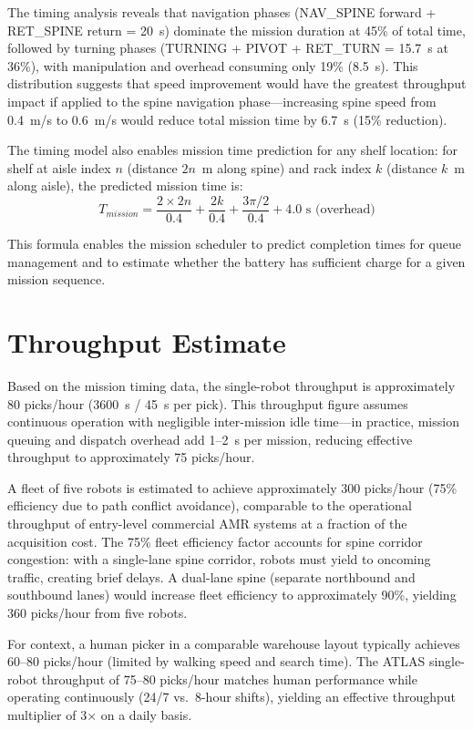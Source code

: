 \documentclass[12pt,a4paper,oneside]{report}
\begin{document}
The timing analysis reveals that navigation phases (NAV\_SPINE forward + RET\_SPINE return = 20~s) dominate the mission duration at 45\% of total time, followed by turning phases (TURNING + PIVOT + RET\_TURN = 15.7~s at 36\%), with manipulation and overhead consuming only 19\% (8.5~s). This distribution suggests that speed improvement would have the greatest throughput impact if applied to the spine navigation phase---increasing spine speed from 0.4~m/s to 0.6~m/s would reduce total mission time by 6.7~s (15\% reduction).

The timing model also enables mission time prediction for any shelf location: for shelf at aisle index $n$ (distance $2n$~m along spine) and rack index $k$ (distance $k$~m along aisle), the predicted mission time is:
\begin{equation}
T_{mission} = \frac{2 \times 2n}{0.4} + \frac{2k}{0.4} + \frac{3\pi/2}{0.4} + 4.0 \text{~s (overhead)}
\end{equation}

This formula enables the mission scheduler to predict completion times for queue management and to estimate whether the battery has sufficient charge for a given mission sequence.

\section{Throughput Estimate}

Based on the mission timing data, the single-robot throughput is approximately 80 picks/hour (3600~s / 45~s per pick). This throughput figure assumes continuous operation with negligible inter-mission idle time---in practice, mission queuing and dispatch overhead add 1--2~s per mission, reducing effective throughput to approximately 75 picks/hour.

A fleet of five robots is estimated to achieve approximately 300 picks/hour (75\% efficiency due to path conflict avoidance), comparable to the operational throughput of entry-level commercial AMR systems at a fraction of the acquisition cost. The 75\% fleet efficiency factor accounts for spine corridor congestion: with a single-lane spine corridor, robots must yield to oncoming traffic, creating brief delays. A dual-lane spine (separate northbound and southbound lanes) would increase fleet efficiency to approximately 90\%, yielding 360 picks/hour from five robots.

For context, a human picker in a comparable warehouse layout typically achieves 60--80 picks/hour (limited by walking speed and search time). The ATLAS single-robot throughput of 75--80 picks/hour matches human performance while operating continuously (24/7 vs.\ 8-hour shifts), yielding an effective throughput multiplier of 3$\times$ on a daily basis.
\end{document}
